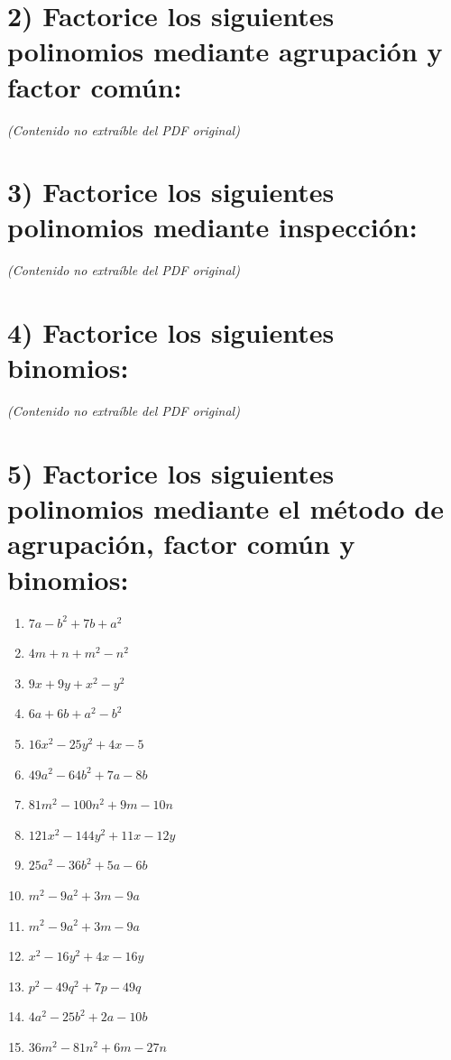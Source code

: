 \documentclass[11pt]{article}
\begin{document}
\section*{2) Factorice los siguientes polinomios mediante agrupación y factor común:}

\vspace{2em}
\noindent\textit{(Contenido no extraíble del PDF original)}

\newpage

\section*{3) Factorice los siguientes polinomios mediante inspección:}

\vspace{2em}
\noindent\textit{(Contenido no extraíble del PDF original)}

\newpage

\section*{4) Factorice los siguientes binomios:}

\vspace{2em}
\noindent\textit{(Contenido no extraíble del PDF original)}

\newpage

\section*{5) Factorice los siguientes polinomios mediante el método de agrupación, factor común y binomios:}

\begin{enumerate}[label=\alph*),itemsep=1.1em,leftmargin=2em]
    \item $7a - b^{2} + 7b + a^{2}$
    \item $4m + n + m^{2} - n^{2}$
    \item $9x + 9y + x^{2} - y^{2}$
    \item $6a + 6b + a^{2} - b^{2}$
    \item $16x^{2} - 25y^{2} + 4x - 5$
    \item $49a^{2} - 64b^{2} + 7a - 8b$
    \item $81m^{2} - 100n^{2} + 9m - 10n$
    \item $121x^{2} - 144y^{2} + 11x - 12y$
    \item $25a^{2} - 36b^{2} + 5a - 6b$
    \item $m^{2} - 9a^{2} + 3m - 9a$
    \item $m^{2} - 9a^{2} + 3m - 9a$
    \item $x^{2} - 16y^{2} + 4x - 16y$
    \item $p^{2} - 49q^{2} + 7p - 49q$
    \item $4a^{2} - 25b^{2} + 2a - 10b$
    \item $36m^{2} - 81n^{2} + 6m - 27n$
\end{enumerate}
\end{document}
